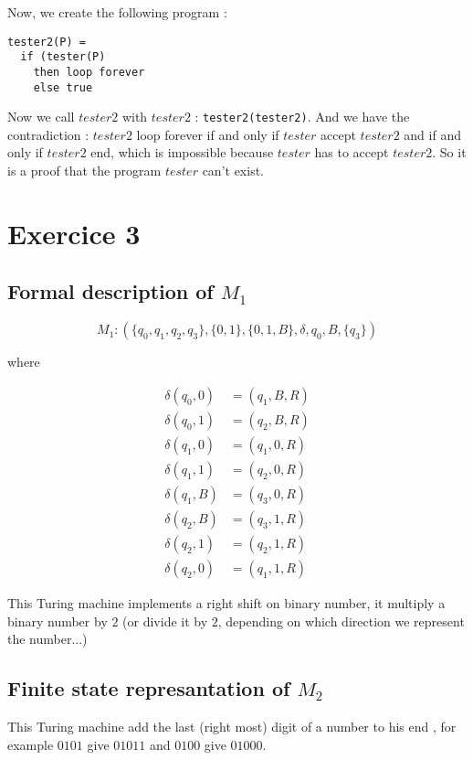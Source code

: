 \documentclass[a4paper,11pt]{report}
\begin{document}
Now, we create the following program :
\begin{verbatim}
tester2(P) = 
  if (tester(P)
    then loop forever
    else true
\end{verbatim}

Now we call $tester2$ with $tester2$ : \verb|tester2(tester2)|. And we have the
contradiction : $tester2$ loop forever if and only if $tester$ accept $tester2$
and if and only if $tester2$ end, which is impossible because $tester$ has to
accept $tester2$. So it is a proof that the program $tester$ can't exist.

\section*{Exercice 3}

\subsection*{Formal description of $M_1$}

\[
  M_1 : (\{q_0,q_1,q_2,q_3\},\{0,1\},\{0,1,B\},\delta,q_0,B,\{q_3\})
\]

where

\begin{align*}
  \delta(q_0,0) &= (q_1,B,R) \\
  \delta(q_0,1) &= (q_2,B,R) \\
  \delta(q_1,0) &= (q_1,0,R) \\
  \delta(q_1,1) &= (q_2,0,R) \\
  \delta(q_1,B) &= (q_3,0,R) \\
  \delta(q_2,B) &= (q_3,1,R) \\
  \delta(q_2,1) &= (q_2,1,R) \\
  \delta(q_2,0) &= (q_1,1,R)
\end{align*}

This Turing machine implements a right shift on binary number, it multiply a
binary number by $2$ (or divide it by $2$, depending on which direction we represent
the number...)

\subsection*{Finite state represantation of $M_2$}

\begin{center}
\end{center}

This Turing machine add the last (right most) digit of a number to his end , for example
$0101$ give $01011$ and $0100$ give $01000$.
\end{document}
